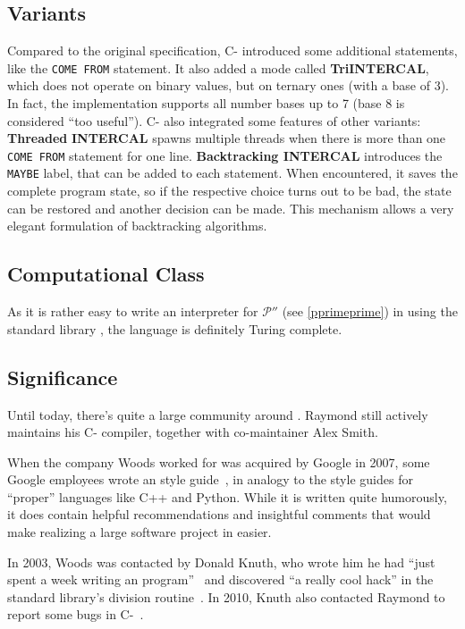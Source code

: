 \subsection{Variants}
\label{intercal-variants}

Compared to the original \ic{} specification, C-\ic{} introduced some additional statements, like the \texttt{COME FROM} statement. It also added a mode called \textbf{TriINTERCAL}, which does not operate on binary values, but on ternary ones (with a base of 3). In fact, the implementation supports all number bases up to 7 (base 8 is considered “too useful”).
C-\ic{} also integrated some features of other \ic{} variants: \textbf{Threaded} \textbf{INTERCAL} spawns multiple threads when there is more than one \texttt{COME FROM} statement for one line. \textbf{Backtracking INTERCAL} introduces the \texttt{MAYBE} label, that can be added to each statement. When encountered, it saves the complete program state, so if the respective choice turns out to be bad, the state can be restored and another decision can be made. This mechanism allows a very elegant formulation of backtracking algorithms.

\subsection{Computational Class}

As it is rather easy to write an interpreter for $\mathcal{P}''$ (see \cref{pprimeprime}) in \ic{} using the standard library \cite{alksentrs2008intercal}, the language is definitely Turing complete.

\subsection{Significance}

Until today, there's quite a large community around \ic{}. Raymond still actively maintains his C-\ic{} compiler, together with co-maintainer Alex Smith.

When the company Woods worked for was acquired by Google in 2007, some Google employees wrote an \ic{} style guide~\cite{raiter2007google}, in analogy to the style guides for “proper” languages like C++ and Python. While it is written quite humorously, it does contain helpful recommendations and insightful comments that would make realizing a large software project in \ic{} easier.

In 2003, Woods was contacted by Donald Knuth, who wrote him he had “just spent a week writing an \ic{} program”~\cite{knuth2003tpk} and discovered “a really cool hack” in the standard library's division routine~\cite{hamilton2008az}. In 2010, Knuth also contacted Raymond to report some bugs in C-\ic{}~\cite{raymond2010donald}.
